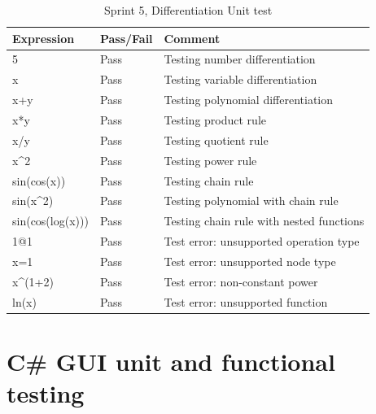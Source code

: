 \documentclass[a4paper, oneside, 11pt]{report}
\begin{document}
\newpage

\begin{table}[h]
\caption{Sprint 5, Differentiation Unit test}
\label{sprint5-differentiation-unit-test}
\begin{tabular}{|l|l|l|}
\hline
\textbf{Expression}       & \textbf{Pass/Fail} & \textbf{Comment}                         \\ \hline
5                         & Pass               & Testing number differentiation           \\ \hline
x                         & Pass               & Testing variable differentiation         \\ \hline
x+y                       & Pass               & Testing polynomial differentiation       \\ \hline
x*y                       & Pass               & Testing product rule                     \\ \hline
x/y                       & Pass               & Testing quotient rule                    \\ \hline
x\textasciicircum{}2      & Pass               & Testing power rule                       \\ \hline
sin(cos(x))               & Pass               & Testing chain rule                       \\ \hline
sin(x\textasciicircum{}2) & Pass               & Testing polynomial with chain rule       \\ \hline
sin(cos(log(x)))          & Pass               & Testing chain rule with nested functions \\ \hline
1@1                       & Pass               & Test error: unsupported operation type   \\ \hline
x=1                       & Pass               & Test error: unsupported node type        \\ \hline
x\textasciicircum{}(1+2)  & Pass               & Test error: non-constant power           \\ \hline
ln(x)                     & Pass               & Test error: unsupported function         \\ \hline
\end{tabular}
\end{table}

\newpage
\section{C\# GUI unit  and functional testing}
\end{document}
